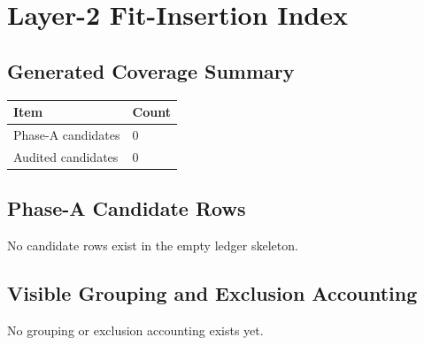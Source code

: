 \providecommand{\AuditPath}[1]{\begingroup\footnotesize\nolinkurl{#1}\endgroup}
\providecommand{\AuditID}[1]{\begingroup\footnotesize\nolinkurl{#1}\endgroup}

\chapter{Layer-2 Fit-Insertion Index}
\label{app:fit-insertion-index}

\section{Generated Coverage Summary}
\label{sec:fit-insertion-generated-summary}

\begin{longtable}{L{0.45\textwidth}L{0.45\textwidth}}
\toprule
Item & Count \\
\midrule
\endhead
Phase-A candidates & 0 \\
Audited candidates & 0 \\
\bottomrule
\end{longtable}

\section{Phase-A Candidate Rows}
\label{sec:fit-insertion-candidate-rows}

No candidate rows exist in the empty ledger skeleton.

\section{Visible Grouping and Exclusion Accounting}
\label{sec:fit-insertion-grouping-exclusion}

No grouping or exclusion accounting exists yet.
